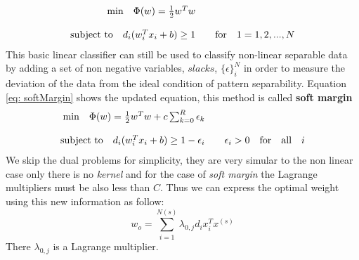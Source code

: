 \documentclass[11pt]{article}
\begin{document}
\begin{equation}
 \begin{array}{r c l}
	\text{min} \quad \Phi(w) = \frac{1}{2} w^Tw \\ 
	\\
	\text{subject to} \quad d_i(w_i^Tx_i + b) \ge 1 && \text{for} \quad 1 = 1,2, ..., N
\end{array}
\label{eq: hard_margin}
\end{equation}
This basic linear classifier can still be used to classify non-linear separable data by adding a set of non negative variables, $slacks$, $\{\epsilon\}_i^N$ in order to measure the deviation of the data from the ideal condition of pattern separability. Equation \ref{eq: softMargin} shows the updated equation, this method is called \textbf{soft margin}
\begin{equation}
 \begin{array}{r c l}
\text{min} \quad \Phi(w) = \frac{1}{2} w^Tw + c \sum_{k=0}^R \epsilon_k \\
	\\
\text{subject to} \quad d_i(w_i^Tx_i + b) \ge 1 - \epsilon_i && \epsilon_i > 0 \quad \text{for} \quad \text{all} \quad  i
\end{array}
\label{eq: softMargin}
\end{equation}
We skip the dual problems for simplicity, they are very simular to the non linear case only there is no \emph{kernel} and for the case of \emph{soft margin} the Lagrange multipliers must be also less than $C$. Thus we can express the optimal weight using this new information as follow:
\begin{equation}
w_o = \sum_{i=1}^{N(s)}\lambda_{0,j}d_ix_i^Tx^{(s)}
\label{eq: optimal_weight_lagrande}
\end{equation}
There $\lambda_{0,j}$ is a Lagrange multiplier.
\end{document}
